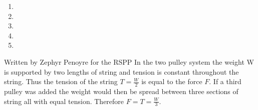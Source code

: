 \begin{problem}
{
\nl
{}
\begin{enumerate}
\item {}
\item {}
\item {}
\item {}
\item {}
\end{enumerate}
}
{Written by Zephyr Penoyre for the RSPP}
{
 In the two pulley system the weight W is supported by two lengths of string and tension is constant throughout the string. Thus the tension of the string $T = \frac{W}{2}$ is equal to the force $F$. If a third pulley was added the weight would then be spread between three sections of string all with equal tension.
Therefore $F = T = \frac{W}{3}$.
}
\end{problem}